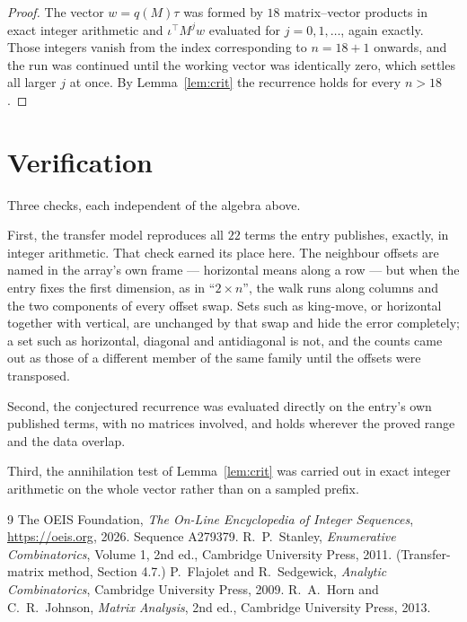 \documentclass[11pt,a4paper]{article}
\theoremstyle{plain}
\theoremstyle{definition}
\begin{document}
\begin{proof}
The vector $w=q(M)\tau$ was formed by $18$ matrix--vector products in exact integer
arithmetic and $\iota^{\!\top}M^{j}w$ evaluated for $j=0,1,\dots$, again exactly. Those
integers vanish from the index corresponding to $n=18+1$ onwards, and the run was
continued until the working vector was identically zero, which settles all larger $j$ at once.
By Lemma~\ref{lem:crit} the recurrence holds for every $n>18$.
\end{proof}

\section{Verification}

Three checks, each independent of the algebra above.

First, the transfer model reproduces all $22$ terms the entry publishes, exactly, in
integer arithmetic. That check earned its place here. The neighbour offsets are named in the
array's own frame --- horizontal means along a row --- but when the entry fixes the first
dimension, as in ``$2\times n$'', the walk runs along columns and the two components of every
offset swap. Sets such as king-move, or horizontal together with vertical, are unchanged by
that swap and hide the error completely; a set such as horizontal, diagonal and antidiagonal
is not, and the counts came out as those of a different member of the same family until the
offsets were transposed.

Second, the conjectured recurrence was evaluated directly on the entry's own published terms,
with no matrices involved, and holds wherever the proved range and the data overlap.

Third, the annihilation test of Lemma~\ref{lem:crit} was carried out in exact integer
arithmetic on the whole vector rather than on a sampled prefix.

\begin{thebibliography}{9}
 The OEIS Foundation, \emph{The On-Line Encyclopedia of Integer
Sequences}, \url{https://oeis.org}, 2026. Sequence A279379.
 R.~P.~Stanley, \emph{Enumerative Combinatorics}, Volume 1, 2nd ed.,
Cambridge University Press, 2011. (Transfer-matrix method, Section 4.7.)
 P.~Flajolet and R.~Sedgewick, \emph{Analytic Combinatorics}, Cambridge
University Press, 2009.
 R.~A.~Horn and C.~R.~Johnson, \emph{Matrix Analysis}, 2nd ed., Cambridge
University Press, 2013.
\end{thebibliography}
\end{document}
